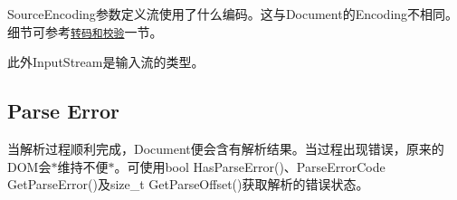 {\ttfamily Source\+Encoding}参数定义流使用了什么编码。这与{\ttfamily Document}的{\ttfamily Encoding}不相同。细节可参考\href{#TranscodingAndValidation}{\tt 转码和校验}一节。

此外{\ttfamily Input\+Stream}是输入流的类型。\hypertarget{md_Cadriciel_Commun_Externe_RapidJSON_doc_dom.zh-cn_ParseError}{}\subsection{Parse Error}\label{md_Cadriciel_Commun_Externe_RapidJSON_doc_dom.zh-cn_ParseError}
当解析过程顺利完成，{\ttfamily Document}便会含有解析结果。当过程出现错误，原来的\+D\+O\+M会$\ast$维持不便$\ast$。可使用{\ttfamily bool Has\+Parse\+Error()}、{\ttfamily Parse\+Error\+Code Get\+Parse\+Error()}及{\ttfamily size\+\_\+t Get\+Parse\+Offset()}获取解析的错误状态。


